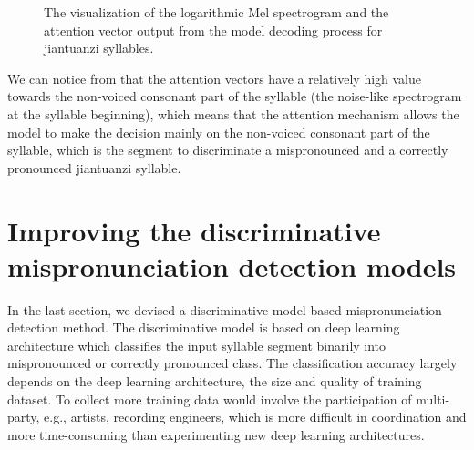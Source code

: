 \begin{figure}[ht!]
  
    \caption[]{The visualization of the logarithmic Mel spectrogram and the attention vector output from the model decoding process for jiantuanzi syllables.}
    \label{fig:ch6:jiantuanzi_att_vector}
\end{figure}


We can notice from  that the attention vectors have a relatively high value towards the non-voiced consonant part of the syllable (the noise-like spectrogram at the syllable beginning), which means that the attention mechanism allows the model to make the decision mainly on the non-voiced consonant part of the syllable, which is the segment to discriminate a mispronounced and a correctly pronounced jiantuanzi syllable.

\section{Improving the discriminative mispronunciation detection models}

In the last section, we devised a discriminative model-based mispronunciation detection method. The discriminative model is based on deep learning architecture which classifies the input syllable segment binarily into mispronounced or correctly pronounced class. The classification accuracy largely depends on the deep learning architecture, the size and quality of training dataset. To collect more training data would involve the participation of multi-party, e.g., artists, recording engineers, which is more difficult in coordination and more time-consuming than experimenting new deep learning architectures. 

